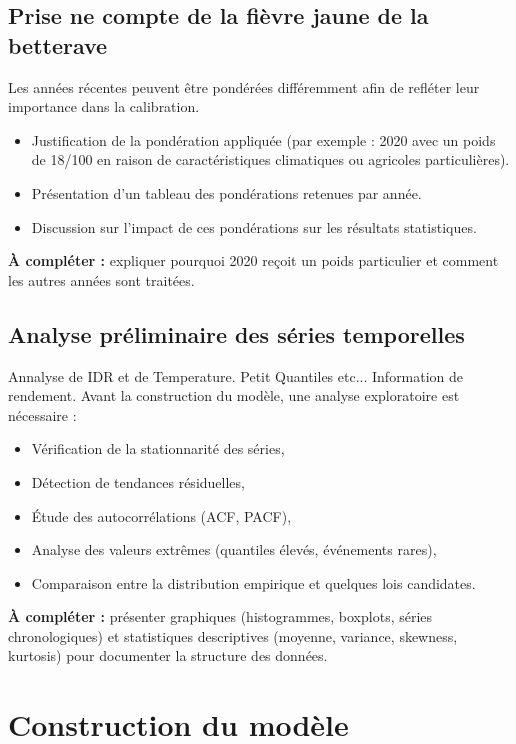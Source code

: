 \documentclass[11pt,a4paper,openright,twoside]{report}
\begin{document}
\section{Prise ne compte de la fièvre jaune de la betterave}
Les années récentes peuvent être pondérées différemment afin de refléter leur importance dans la calibration. 
\begin{itemize}
    \item Justification de la pondération appliquée (par exemple : 2020 avec un poids de 18/100 en raison de caractéristiques climatiques ou agricoles particulières).
    \item Présentation d’un tableau des pondérations retenues par année.
    \item Discussion sur l’impact de ces pondérations sur les résultats statistiques.
\end{itemize}

\textbf{À compléter :} expliquer pourquoi 2020 reçoit un poids particulier et comment les autres années sont traitées.

\section{Analyse préliminaire des séries temporelles}
Annalyse de IDR et de Temperature. Petit Quantiles etc... 
Information de rendement. 
Avant la construction du modèle, une analyse exploratoire est nécessaire :
\begin{itemize}
    \item Vérification de la stationnarité des séries,
    \item Détection de tendances résiduelles,
    \item Étude des autocorrélations (ACF, PACF),
    \item Analyse des valeurs extrêmes (quantiles élevés, événements rares),
    \item Comparaison entre la distribution empirique et quelques lois candidates.
\end{itemize}

\textbf{À compléter :} présenter graphiques (histogrammes, boxplots, séries chronologiques) et statistiques descriptives (moyenne, variance, skewness, kurtosis) pour documenter la structure des données.

\chapter{Construction du modèle}
\end{document}
